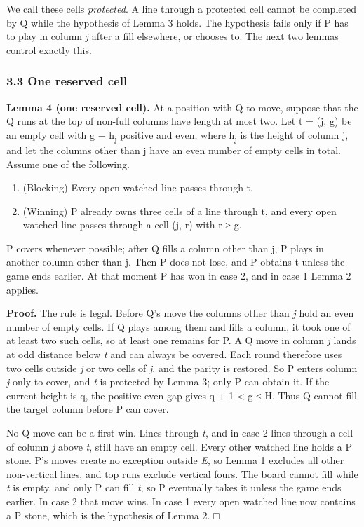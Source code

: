 \documentclass[
  a4paper,
]{article}
\providecommand{\tightlist}{%
  \setlength{\itemsep}{0pt}\setlength{\parskip}{0pt}}
\begin{document}
We call these cells \emph{protected}. A line through a protected cell
cannot be completed by Q while the hypothesis of Lemma 3 holds. The
hypothesis fails only if P has to play in column \emph{j} after a fill
elsewhere, or chooses to. The next two lemmas control exactly this.

\subsubsection{3.3 One reserved cell}\label{one-reserved-cell}

\textbf{Lemma 4 (one reserved cell).} At a position with Q to move,
suppose that the Q runs at the top of non-full columns have length at
most two. Let t = (j, g) be an empty cell with g − h\textsubscript{j}
positive and even, where h\textsubscript{j} is the height of column j,
and let the columns other than j have an even number of empty cells in
total. Assume one of the following.

\begin{enumerate}
\def\labelenumi{\arabic{enumi}.}
\tightlist
\item
  (Blocking) Every open watched line passes through t.
\item
  (Winning) P already owns three cells of a line through t, and every
  open watched line passes through a cell (j, r) with r ≥ g.
\end{enumerate}

P covers whenever possible; after Q fills a column other than j, P plays
in another column other than j. Then P does not lose, and P obtains t
unless the game ends earlier. At that moment P has won in case 2, and in
case 1 Lemma 2 applies.

\textbf{Proof.} The rule is legal. Before Q's move the columns other
than \emph{j} hold an even number of empty cells. If Q plays among them
and fills a column, it took one of at least two such cells, so at least
one remains for P. A Q move in column \emph{j} lands at odd distance
below \emph{t} and can always be covered. Each round therefore uses two
cells outside \emph{j} or two cells of \emph{j}, and the parity is
restored. So P enters column \emph{j} only to cover, and \emph{t} is
protected by Lemma 3; only P can obtain it. If the current height is q,
the positive even gap gives q + 1 \textless{} g ≤ H. Thus Q cannot fill
the target column before P can cover.

No Q move can be a first win. Lines through \emph{t}, and in case 2
lines through a cell of column \emph{j} above \emph{t}, still have an
empty cell. Every other watched line holds a P stone. P's moves create
no exception outside \emph{E}, so Lemma 1 excludes all other
non-vertical lines, and top runs exclude vertical fours. The board
cannot fill while \emph{t} is empty, and only P can fill \emph{t}, so P
eventually takes it unless the game ends earlier. In case 2 that move
wins. In case 1 every open watched line now contains a P stone, which is
the hypothesis of Lemma 2. □
\end{document}
